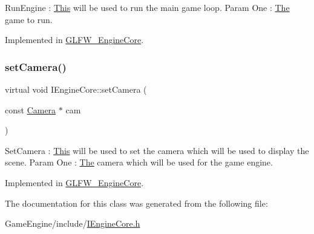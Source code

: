 Run\+Engine \+: \mbox{\hyperlink{class_this}{This}} will be used to run the main game loop. Param One \+: \mbox{\hyperlink{class_the}{The}} game to run. 

Implemented in \mbox{\hyperlink{class_g_l_f_w___engine_core_adf9266f1a9b5d97992691224f0f20c7b}{G\+L\+F\+W\+\_\+\+Engine\+Core}}.

\mbox{\label{class_i_engine_core_ab2f643ce25708c87b20eecdcbb18b9ac}} 
\subsubsection{\texorpdfstring{set\+Camera()}{setCamera()}}
{\footnotesize\ttfamily virtual void I\+Engine\+Core\+::set\+Camera (\begin{DoxyParamCaption}\item[{const \mbox{\hyperlink{class_camera}{Camera}} $\ast$}]{cam }\end{DoxyParamCaption})\hspace{0.3cm}{\ttfamily [pure virtual]}}

Set\+Camera \+: \mbox{\hyperlink{class_this}{This}} will be used to set the camera which will be used to display the scene. Param One \+: \mbox{\hyperlink{class_the}{The}} camera which will be used for the game engine. 

Implemented in \mbox{\hyperlink{class_g_l_f_w___engine_core_a2aba4fb8a635f96fc4057ba841670a29}{G\+L\+F\+W\+\_\+\+Engine\+Core}}.



The documentation for this class was generated from the following file\+:\begin{DoxyCompactItemize}
\item 
Game\+Engine/include/\mbox{\hyperlink{_i_engine_core_8h}{I\+Engine\+Core.\+h}}\end{DoxyCompactItemize}
